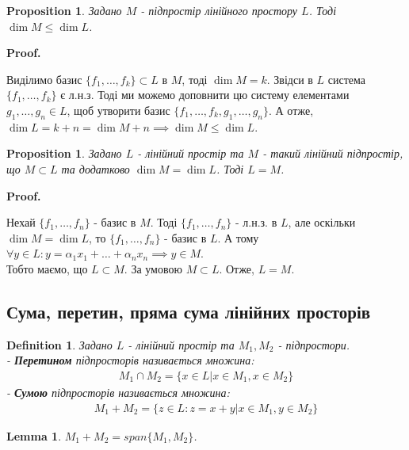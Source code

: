 \documentclass[a4paper, 10pt]{article}
\makeatletter
\def\qed{$\blacksquare$}
\theoremstyle{theoremdd}
\theoremstyle{theoremdd}
\newtheorem{definition}[theorem]{Definition}
\theoremstyle{theoremdd}
\theoremstyle{theoremdd}
\theoremstyle{theoremdd}
\newtheorem{proposition}[theorem]{Proposition}
\theoremstyle{theoremdd}
\theoremstyle{theoremdd}
\newtheorem{lemma}[theorem]{Lemma}
\theoremstyle{theoremdd}
\renewenvironment{proof}[1][Proof.\\]{\par
\pushQED{\hfill \qed}%
\normalfont \topsep6\p@\@plus6\p@\relax
\trivlist
\item\relax
{\bfseries
#1\@addpunct{.}}\hspace\labelsep\ignorespaces
}{%
\popQED\endtrivlist\@endpefalse
}
\makeatother
\begin{document}
	\begin{proposition}
	Задано $M$ - підпростір лінійного простору $L$. Тоді $\dim M \leq \dim L$.
	\end{proposition}
	
	\begin{proof}
	Виділимо базис $\{f_1,\dots,f_k\} \subset L$ в $M$, тоді $\dim M = k$. Звідси в $L$ система $\{f_1,\dots,f_k\}$ є л.н.з. Тоді ми можемо доповнити цю систему елементами $g_1,\dots,g_n \in L$, щоб утворити базис $\{f_1,\dots,f_k,g_1,\dots,g_n\}$. А отже, $\dim L = k+n = \dim M + n \implies \dim M \leq \dim L$.
	\end{proof}
	
	\begin{proposition}
	Задано $L$ - лінійний простір та $M$ - такий лінійний підпростір, що $M \subset L$ та додатково $\dim M = \dim L$. Тоді $L=M$.
	\end{proposition}
	
	\begin{proof}
	Нехай $\{f_1,\dots,f_n\}$ - базис в $M$. Тоді $\{f_1,\dots,f_n\}$ - л.н.з. в $L$, але оскільки $\dim M = \dim L$, то $\{f_1,\dots,f_n\}$ - базис в $L$. А тому $\forall y \in L: y = \alpha_1 x_1 + \dots + \alpha_n x_n \implies y \in M$.\\
	Тобто маємо, що $L \subset M$. За умовою $M \subset L$. Отже, $L=M$.
	\end{proof}
	
	\subsection{Сума, перетин, пряма сума лінійних просторів}
	\begin{definition}
	Задано $L$ - лінійний простір та $M_1, M_2$ - підпростори.\\
	- \textbf{Перетином} підпросторів називається множина:
	\begin{align*}
	M_1 \cap M_2 = \{x \in L | x \in M_1, x \in M_2 \}
	\end{align*}
	- \textbf{Сумою} підпросторів називається множина:
	\begin{align*}
	M_1 + M_2 = \{z \in L: z = x + y | x \in M_1, y \in M_2\}
	\end{align*}
	\end{definition}
	
	\begin{lemma}
	$M_1 + M_2 = span\{M_1, M_2\}$.
	\end{lemma}
	
\end{document}
